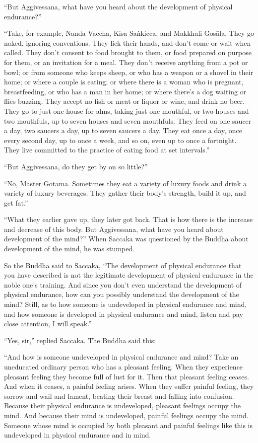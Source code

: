 \documentclass[12pt,openany]{book}%
\begin{document}
“But Aggivessana, what have you heard about the development of physical endurance?” 

“Take, for example, Nanda Vaccha, Kisa \textsanskrit{Saṅkicca}, and Makkhali \textsanskrit{Gosāla}. They go naked, ignoring conventions. They lick their hands, and don’t come or wait when called. They don’t consent to food brought to them, or food prepared on purpose for them, or an invitation for a meal. They don’t receive anything from a pot or bowl; or from someone who keeps sheep, or who has a weapon or a shovel in their home; or where a couple is eating; or where there is a woman who is pregnant, breastfeeding, or who has a man in her home; or where there’s a dog waiting or flies buzzing. They accept no fish or meat or liquor or wine, and drink no beer. They go to just one house for alms, taking just one mouthful, or two houses and two mouthfuls, up to seven houses and seven mouthfuls. They feed on one saucer a day, two saucers a day, up to seven saucers a day. They eat once a day, once every second day, up to once a week, and so on, even up to once a fortnight. They live committed to the practice of eating food at set intervals.” 

“But Aggivessana, do they get by on so little?” 

“No, Master Gotama. Sometimes they eat a variety of luxury foods and drink a variety of luxury beverages. They gather their body’s strength, build it up, and get fat.” 

“What they earlier gave up, they later got back. That is how there is the increase and decrease of this body. But Aggivessana, what have you heard about development of the mind?” When Saccaka was questioned by the Buddha about development of the mind, he was stumped. 

So the Buddha said to Saccaka, “The development of physical endurance that you have described is not the legitimate development of physical endurance in the noble one’s training. And since you don’t even understand the development of physical endurance, how can you possibly understand the development of the mind? Still, as to how someone is undeveloped in physical endurance and mind, and how someone is developed in physical endurance and mind, listen and pay close attention, I will speak.” 

“Yes, sir,” replied Saccaka. The Buddha said this: 

“And how is someone undeveloped in physical endurance and mind? Take an uneducated ordinary person who has a pleasant feeling. When they experience pleasant feeling they become full of lust for it. Then that pleasant feeling ceases. And when it ceases, a painful feeling arises. When they suffer painful feeling, they sorrow and wail and lament, beating their breast and falling into confusion. Because their physical endurance is undeveloped, pleasant feelings occupy the mind. And because their mind is undeveloped, painful feelings occupy the mind. Someone whose mind is occupied by both pleasant and painful feelings like this is undeveloped in physical endurance and in mind. 
\end{document}
